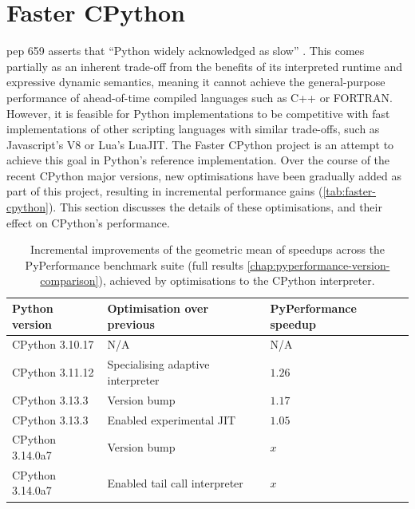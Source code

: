 \section{Faster CPython}
\label{sec:faster-cpython}

\acf{pep} 659 asserts that ``Python widely acknowledged as slow'' \cite{pep659}.
This comes partially as an inherent trade-off from the benefits of its interpreted runtime and expressive dynamic semantics, meaning it cannot achieve the general-purpose performance of ahead-of-time compiled languages such as C++ or FORTRAN. However, it is feasible for Python implementations to be competitive with fast implementations of other scripting languages with similar trade-offs, such as Javascript's V8 or Lua's LuaJIT. The Faster CPython project is an attempt to achieve this goal in Python's reference implementation. Over the course of the recent CPython major versions, new optimisations have been gradually added as part of this project, resulting in incremental performance gains (\autoref{tab:faster-cpython}).
This section discusses the details of these optimisations, and their effect on CPython's performance. %


\begin{table}[H]
  \caption{Incremental improvements of the geometric mean of speedups across the PyPerformance benchmark suite (full results \autoref{chap:pyperformance-version-comparison}), achieved by optimisations to the CPython interpreter.}
  \label{tab:faster-cpython}
  \centering
  \begin{tabular}{lll}
    \toprule
    \textbf{Python version} & \textbf{Optimisation over previous} & \textbf{PyPerformance speedup} \\
    \midrule
    CPython 3.10.17 & N/A & N/A \\
    CPython 3.11.12 & Specialising adaptive interpreter & $1.26$ \\
    CPython 3.13.3 & Version bump & $1.17$ \\
    CPython 3.13.3 & Enabled experimental JIT & $1.05$ \\
    CPython 3.14.0a7 & Version bump & $x$ \\
    CPython 3.14.0a7 & Enabled tail call interpreter & $x$ \\
    \bottomrule
  \end{tabular}
\end{table}

